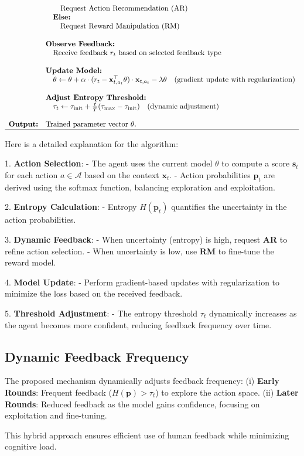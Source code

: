 \[\begin{array}{ll}
& \quad \quad \text{Request Action Recommendation (AR)} \\
& \quad \textbf{Else:} \\
& \quad \quad \text{Request Reward Manipulation (RM)} \\
\\
& \textbf{Observe Feedback:} \\
& \quad \text{Receive feedback } r_t \text{ based on selected feedback type} \\
\\
& \textbf{Update Model:} \\
& \quad \theta \leftarrow \theta + \alpha \cdot (r_t - \mathbf{x}_{t,a_t}^\top \theta) \cdot \mathbf{x}_{t,a_t} - \lambda \theta \quad (\text{gradient update with regularization}) \\
\\
& \textbf{Adjust Entropy Threshold:} \\
& \quad \tau_t \leftarrow \tau_{\text{init}} + \frac{t}{T} (\tau_{\text{max}} - \tau_{\text{init}}) \quad (\text{dynamic adjustment}) \\
\\
\textbf{Output:} & \text{Trained parameter vector } \theta. \\
\hline
\end{array}
\]

Here is a detailed explanation for the algorithm:

1. \textbf{Action Selection}:
   - The agent uses the current model \(\theta\) to compute a score \(\mathbf{s}_t\) for each action \(a \in \mathcal{A}\) based on the context \(\mathbf{x}_t\).
   - Action probabilities \(\mathbf{p}_t\) are derived using the softmax function, balancing exploration and exploitation.

2. \textbf{Entropy Calculation}:
   - Entropy \(H(\mathbf{p}_t)\) quantifies the uncertainty in the action probabilities.

3. \textbf{Dynamic Feedback}:
   - When uncertainty (entropy) is high, request \textbf{AR} to refine action selection.
   - When uncertainty is low, use \textbf{RM} to fine-tune the reward model.

4. \textbf{Model Update}:
   - Perform gradient-based updates with regularization to minimize the loss based on the received feedback.

5. \textbf{Threshold Adjustment}:
   - The entropy threshold \(\tau_t\) dynamically increases as the agent becomes more confident, reducing feedback frequency over time.
   
\subsection{Dynamic Feedback Frequency}

The proposed mechanism dynamically adjusts feedback frequency: (i) \textbf{Early Rounds}: Frequent feedback (\(H(\mathbf{p}) > \tau_t\)) to explore the action space. (ii) \textbf{Later Rounds}: Reduced feedback as the model gains confidence, focusing on exploitation and fine-tuning.

This hybrid approach ensures efficient use of human feedback while minimizing cognitive load.
